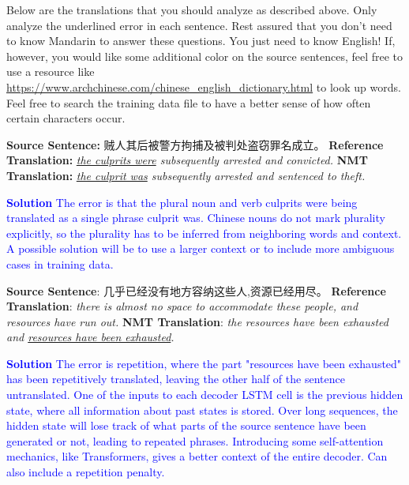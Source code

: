 \begin{parts}
    Below are the translations that you should analyze as described above. Only analyze the underlined error in each sentence. Rest assured that you don't need to know Mandarin to answer these questions. You just need to know English! If, however, you would like some additional color on the source sentences, feel free to use a resource like \url{https://www.archchinese.com/chinese_english_dictionary.html} to look up words. Feel free to search the training data file to have a better sense of how often certain characters occur.

    \begin{subparts}
        \subpart[2]
        \textbf{Source Sentence:} 贼人其后被警方拘捕及被判处盗窃罪名成立。 \newline
        \textbf{Reference Translation:} \textit{\underline{the culprits were} subsequently arrested and convicted.}\newline
        \textbf{NMT Translation:} \textit{\underline{the culprit was} subsequently arrested and sentenced to theft.}
        
        \textcolor{blue}{
            \textbf{Solution} The error is that the plural noun and verb culprits were being translated as a single phrase culprit was. Chinese nouns do not mark plurality explicitly, so the plurality has to be inferred from neighboring words and context. A possible solution will be to use a larger context or to include more ambiguous cases in training data.
        }

        \subpart[2]
        \textbf{Source Sentence}: 几乎已经没有地方容纳这些人,资源已经用尽。\newline
        \textbf{Reference Translation}: \textit{there is almost no space to accommodate these people, and resources have run out.   }\newline
        \textbf{NMT Translation}: \textit{the resources have been exhausted and \underline{resources have been exhausted}.}
        
        \textcolor{blue}{
            \textbf{Solution} The error is repetition, where the part "resources have been exhausted" has been repetitively translated, leaving the other half of the sentence untranslated. One of the inputs to each decoder LSTM cell is the previous hidden state, where all information about past states is stored. Over long sequences, the hidden state will lose track of what parts of the source sentence have been generated or not, leading to repeated phrases. Introducing some self-attention mechanics, like Transformers, gives a better context of the entire decoder. Can also include a repetition penalty.
        }


\end{subparts}
\end{parts}

